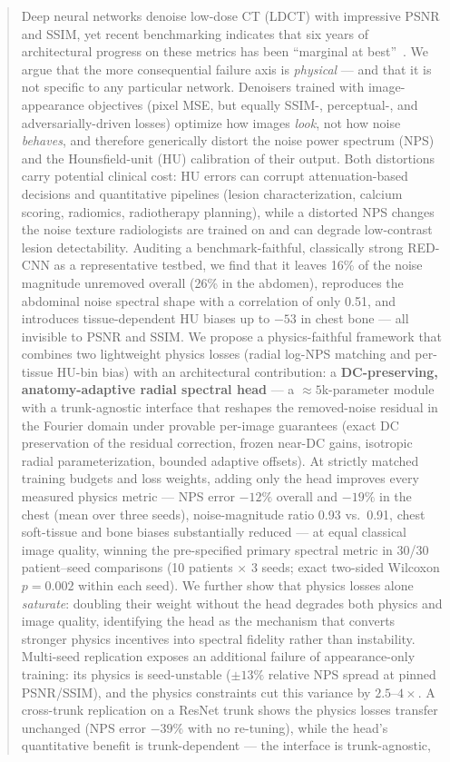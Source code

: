 \begin{abstract}
Deep neural networks denoise low-dose CT (LDCT) with impressive PSNR and SSIM, yet recent benchmarking indicates that six years of architectural progress on these metrics has been ``marginal at best''~\cite{eulig2024}. We argue that the more consequential failure axis is \emph{physical} --- and that it is not specific to any particular network. Denoisers trained with image-appearance objectives (pixel MSE, but equally SSIM-, perceptual-, and adversarially-driven losses) optimize how images \emph{look}, not how noise \emph{behaves}, and therefore generically distort the noise power spectrum (NPS) and the Hounsfield-unit (HU) calibration of their output. Both distortions carry potential clinical cost: HU errors can corrupt attenuation-based decisions and quantitative pipelines (lesion characterization, calcium scoring, radiomics, radiotherapy planning), while a distorted NPS changes the noise texture radiologists are trained on and can degrade low-contrast lesion detectability. Auditing a benchmark-faithful, classically strong RED-CNN as a representative testbed, we find that it leaves 16\% of the noise magnitude unremoved overall (26\% in the abdomen), reproduces the abdominal noise spectral shape with a correlation of only 0.51, and introduces tissue-dependent HU biases up to $-53$\hu{} in chest bone --- all invisible to PSNR and SSIM. We propose a physics-faithful framework that combines two lightweight physics losses (radial log-NPS matching and per-tissue HU-bin bias) with an architectural contribution: a \textbf{DC-preserving, anatomy-adaptive radial spectral head} --- a ${\approx}5$k-parameter module with a trunk-agnostic interface that reshapes the removed-noise residual in the Fourier domain under provable per-image guarantees (exact DC preservation of the residual correction, frozen near-DC gains, isotropic radial parameterization, bounded adaptive offsets). At strictly matched training budgets and loss weights, adding only the head improves every measured physics metric --- NPS error $-12\%$ overall and $-19\%$ in the chest (mean over three seeds), noise-magnitude ratio 0.93 vs.\ 0.91, chest soft-tissue and bone biases substantially reduced --- at equal classical image quality, winning the pre-specified primary spectral metric in 30/30 patient--seed comparisons (10 patients $\times$ 3 seeds; exact two-sided Wilcoxon $p = 0.002$ within each seed). We further show that physics losses alone \emph{saturate}: doubling their weight without the head degrades both physics and image quality, identifying the head as the mechanism that converts stronger physics incentives into spectral fidelity rather than instability. Multi-seed replication exposes an additional failure of appearance-only training: its physics is seed-unstable ($\pm 13\%$ relative NPS spread at pinned PSNR/SSIM), and the physics constraints cut this variance by $2.5$--$4\times$. A cross-trunk replication on a ResNet trunk shows the physics losses transfer unchanged (NPS error $-39\%$ with no re-tuning), while the head's quantitative benefit is trunk-dependent --- the interface is trunk-agnostic, 
\end{abstract}
